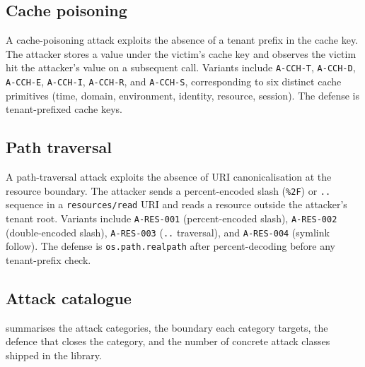 \documentclass[sigconf, anonymous, natbib=false]{acmart}
\begin{document}
\subsection{Cache poisoning}

A cache-poisoning attack exploits the absence of a tenant
prefix in the cache key. The attacker stores a value under
the victim's cache key and observes the victim hit the
attacker's value on a subsequent call. Variants include
\texttt{A-CCH-T}, \texttt{A-CCH-D}, \texttt{A-CCH-E},
\texttt{A-CCH-I}, \texttt{A-CCH-R}, and \texttt{A-CCH-S},
corresponding to six distinct cache primitives (time,
domain, environment, identity, resource, session). The
defense is tenant-prefixed cache keys.

\subsection{Path traversal}

A path-traversal attack exploits the absence of URI
canonicalisation at the resource boundary. The attacker
sends a percent-encoded slash (\texttt{\%2F}) or
\texttt{..} sequence in a \texttt{resources/read} URI and
reads a resource outside the attacker's tenant root.
Variants include \texttt{A-RES-001} (percent-encoded
slash), \texttt{A-RES-002} (double-encoded slash),
\texttt{A-RES-003} (\texttt{..} traversal), and
\texttt{A-RES-004} (symlink follow). The defense is
\texttt{os.path.realpath} after percent-decoding before
any tenant-prefix check.

\subsection{Attack catalogue}

 summarises the attack categories, the
boundary each category targets, the defence that closes
the category, and the number of concrete attack classes
shipped in the library.
\end{document}
